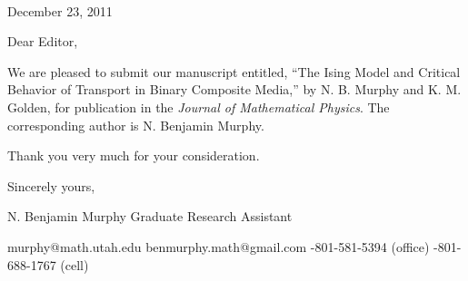 \documentclass[12pt]{article}
\begin{document}
~~
\pagestyle{empty}

\vspace{5ex}

%
\begin{flushright}
  December 23, 2011
\end{flushright} 
%
Dear Editor,\newline

\noindent
We are pleased to submit our manuscript entitled, ``The Ising Model
and Critical Behavior of Transport in Binary Composite Media,'' by
N. B. Murphy and K. M. Golden, for publication in the \textit{Journal of
Mathematical Physics}. The corresponding author is N. Benjamin Murphy.
\newline 

\vspace{-0.5em}
\noindent
Thank you very much for your consideration. 

\vspace{1em}
\noindent
Sincerely yours,

\vspace{3em}
\noindent
N. Benjamin Murphy\newline
Graduate Research Assistant\newline

\noindent
murphy@math.utah.edu       \newline
benmurphy.math@gmail.com   -801-581-5394 (office)    -801-688-1767 (cell)



\end{document}
